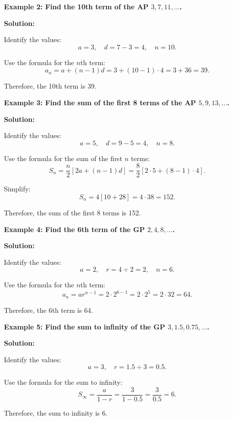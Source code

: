 \begin{flushleft}
\textbf{Example 2: Find the 10th term of the AP $3, 7, 11, \dots$.}

\vspace{0.5cm}
\textbf{Solution:}
\vspace{0.5cm}

Identify the values:
\[
a = 3, \quad d = 7 - 3 = 4, \quad n = 10.
\]

Use the formula for the $n$th term:
\[
a_n = a + (n-1)d = 3 + (10-1) \cdot 4 = 3 + 36 = 39.
\]

Therefore, the 10th term is 39.
\end{flushleft}

\begin{flushleft}
\textbf{Example 3: Find the sum of the first 8 terms of the AP $5, 9, 13, \dots$.}

\vspace{0.5cm}
\textbf{Solution:}
\vspace{0.5cm}

Identify the values:
\[
a = 5, \quad d = 9 - 5 = 4, \quad n = 8.
\]

Use the formula for the sum of the first $n$ terms:
\[
S_n = \frac{n}{2} [2a + (n-1)d] = \frac{8}{2} [2 \cdot 5 + (8-1) \cdot 4].
\]

Simplify:
\[
S_n = 4 [10 + 28] = 4 \cdot 38 = 152.
\]

Therefore, the sum of the first 8 terms is 152.
\end{flushleft}

\begin{flushleft}
\textbf{Example 4: Find the 6th term of the GP $2, 4, 8, \dots$.}

\vspace{0.5cm}
\textbf{Solution:}
\vspace{0.5cm}

Identify the values:
\[
a = 2, \quad r = 4 \div 2 = 2, \quad n = 6.
\]

Use the formula for the $n$th term:
\[
a_n = ar^{n-1} = 2 \cdot 2^{6-1} = 2 \cdot 2^5 = 2 \cdot 32 = 64.
\]

Therefore, the 6th term is 64.
\end{flushleft}

\begin{flushleft}
\textbf{Example 5: Find the sum to infinity of the GP $3, 1.5, 0.75, \dots$.}

\vspace{0.5cm}
\textbf{Solution:}
\vspace{0.5cm}

Identify the values:
\[
a = 3, \quad r = 1.5 \div 3 = 0.5.
\]

Use the formula for the sum to infinity:
\[
S_\infty = \frac{a}{1-r} = \frac{3}{1-0.5} = \frac{3}{0.5} = 6.
\]

Therefore, the sum to infinity is 6.
\end{flushleft}

